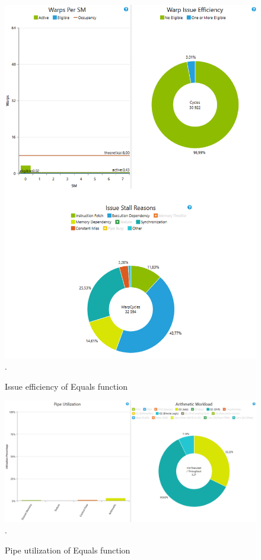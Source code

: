 \documentclass[oneside,openright,12pt,final,en]{mgr}
\begin{document}
\begin{figure}[H]
	\centering
	\includegraphics[width=\textwidth]{equals_issue}.
	\caption{Issue efficiency of Equals function}
	\label{fig:equals_issue}
\end{figure}

\begin{figure}[H]
	\centering
	\includegraphics[width=\textwidth]{equals_pipe}.
	\caption{Pipe utilization of Equals function}
	\label{fig:equals_pipe}
\end{figure}
\end{document}
